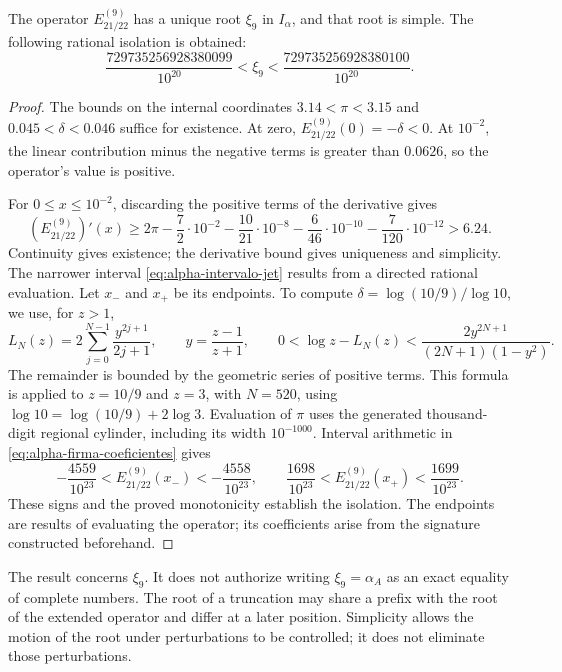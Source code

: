 \begin{proposition}
\label{prop:alpha-raiz-jet}
The operator \(E_{21/22}^{(9)}\) has a unique root
\(\xi_9\) in \(I_\alpha\), and that root is simple. The following rational isolation is obtained:
\begin{equation}
 \frac{729735256928380099}{10^{20}}
 <\xi_9<\frac{729735256928380100}{10^{20}}.
 \label{eq:alpha-intervalo-jet}
\end{equation}
\end{proposition}

\begin{proof}
The bounds on the internal coordinates
\(3.14<\pi<3.15\) and
\(0.045<\delta<0.046\) suffice for existence. At zero,
\(E_{21/22}^{(9)}(0)=-\delta<0\). At \(10^{-2}\), the linear
contribution minus the negative terms is greater than \(0.0626\), so the
operator's value is positive.

For \(0\leq x\leq10^{-2}\), discarding the positive terms of
the derivative gives
\[
 (E_{21/22}^{(9)})'(x)
 \geq2\pi-\frac72\cdot10^{-2}
 -\frac{10}{21}\cdot10^{-8}-\frac6{46}\cdot10^{-10}
 -\frac7{120}\cdot10^{-12}>6.24.
\]
Continuity gives existence; the derivative bound gives uniqueness and
simplicity. The narrower interval
\eqref{eq:alpha-intervalo-jet} results from a directed rational evaluation.
Let \(x_-\) and \(x_+\) be its endpoints. To compute
\(\delta=\log(10/9)/\log 10\), we use, for \(z>1\),
\[
 L_N(z)=2\sum_{j=0}^{N-1}\frac{y^{2j+1}}{2j+1},\qquad
 y=\frac{z-1}{z+1},\qquad
 0<\log z-L_N(z)<\frac{2y^{2N+1}}{(2N+1)(1-y^2)}.
\]
The remainder is bounded by the geometric series of positive terms.
This formula is applied to \(z=10/9\) and \(z=3\), with \(N=520\),
using \(\log 10=\log(10/9)+2\log3\). Evaluation of
\(\pi\) uses the generated thousand-digit regional cylinder, including
its width \(10^{-1000}\). Interval arithmetic in
\eqref{eq:alpha-firma-coeficientes} gives
\[
 -\frac{4559}{10^{23}}<E_{21/22}^{(9)}(x_-)< -\frac{4558}{10^{23}},
 \qquad
 \frac{1698}{10^{23}}<E_{21/22}^{(9)}(x_+)<\frac{1699}{10^{23}}.
\]
These signs and the proved monotonicity establish the isolation. The endpoints
are results of evaluating the operator; its coefficients arise from
the signature constructed beforehand.
\end{proof}

The result concerns \(\xi_9\). It does not authorize writing
\(\xi_9=\alpha_A\) as an exact equality of complete numbers.
The root of a truncation may share a prefix with the root of the
extended operator and differ at a later position. Simplicity
allows the motion of the root under perturbations to be controlled; it does not
eliminate those perturbations.

